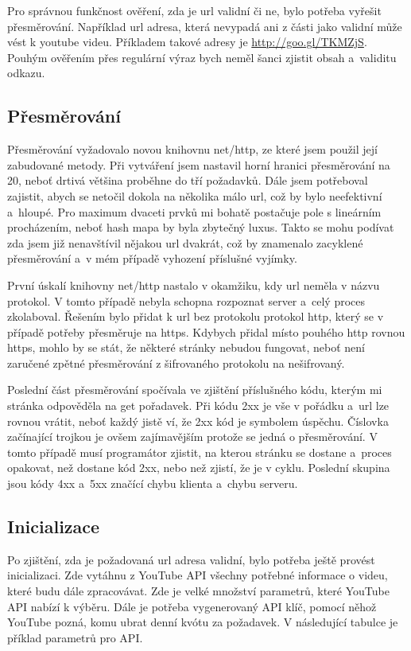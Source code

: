 \par Pro správnou funkčnost ověření, zda je url validní či ne, bylo potřeba vyřešit přesměrování. Například url adresa, která nevypadá ani z části jako validní může vést k youtube videu. Příkladem takové adresy je \url{http://goo.gl/TKMZjS}. Pouhým ověřením přes regulární výraz bych neměl šanci zjistit obsah a~validitu odkazu. 

\subsection{Přesměrování}
\par Přesměrování\cite{nethttp} vyžadovalo novou knihovnu net/http\cite{nethttp}, ze které jsem použil její zabudované metody. Při vytváření jsem nastavil horní hranici přesměrování na 20, neboť drtivá většina proběhne do tří požadavků. Dále jsem potřeboval zajistit, abych se netočil dokola na několika málo url, což by bylo neefektivní a~hloupé. Pro maximum dvaceti prvků mi bohatě postačuje pole s lineárním procházením, neboť hash mapa by byla zbytečný luxus. Takto se mohu podívat zda jsem již nenavštívil nějakou url dvakrát, což by znamenalo zacyklené přesměrování a~v mém případě vyhození příslušné vyjímky.
\par První úskalí knihovny net/http\cite{nethttp} nastalo v okamžiku, kdy url neměla v názvu protokol. V tomto případě nebyla schopna rozpoznat server a~celý proces zkolaboval. Řešením bylo přidat k url bez protokolu protokol http, který se v případě potřeby přesměruje na https. Kdybych přidal místo pouhého http rovnou https, mohlo by se stát, že některé stránky nebudou fungovat, neboť není zaručené zpětné přesměrování z šifrovaného protokolu na nešifrovaný.
\par Poslední část přesměrování spočívala ve zjištění příslušného kódu, kterým mi stránka odpověděla na get pořadavek. Při kódu 2xx je vše v pořádku a~url lze rovnou vrátit, neboť každý jistě ví, že 2xx kód je symbolem úspěchu. Číslovka začínající trojkou je ovšem zajímavějším protože se jedná o přesměrování. V tomto případě musí programátor zjistit, na kterou stránku se dostane a~proces opakovat, než dostane kód 2xx, nebo než zjistí, že je v cyklu. Poslední skupina jsou kódy 4xx a~5xx značící chybu klienta a~chybu serveru.
\subsection{Inicializace}
\par Po zjištění, zda je požadovaná url adresa validní, bylo potřeba ještě provést inicializaci. Zde vytáhnu z YouTube API všechny potřebné informace o videu, které budu dále zpracovávat. Zde je velké množství parametrů, které YouTube API nabízí k výběru. Dále je potřeba vygenerovaný API klíč\cite{apistart}, pomocí něhož YouTube pozná, komu ubrat denní kvótu za požadavek. V následující tabulce je příklad parametrů pro API.

